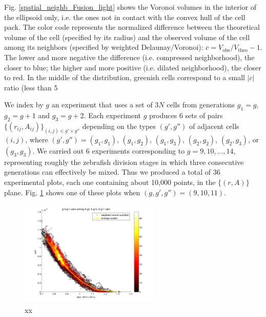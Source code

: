 Fig. \ref{spatial_neighb_Fusion_light} shows the Voronoi volumes in the interior of the ellipsoid only, i.e. the ones not in contact with the convex hull of the cell pack. The color code represents the normalized difference between the theoretical volume of the cell (specified by its radius) and the observed volume of the cell among its neighbors (specified by weighted Delaunay/Voronoi): $c = V_{\mathrm{obs}}/V_{\mathrm{theo}} - 1$. The lower and more negative the difference (i.e. compressed neighborhood), the closer to blue; the higher and more positive (i.e. dilated neighborhood), the closer to red. In the middle of the distribution, greenish cells correspond to a small $|c|$ ratio (less than 5%

We index by $g$ an experiment that uses a set of $3N$ cells from generations $g_1=g$, $g_2=g+1$ and $g_3=g+2$. Each experiment $g$ produces 6 sets of pairs $\{(r_{ij}, A_{ij})\}_{(i,j)\in g'\times g''}$ depending on the types $(g',g'')$ of adjacent cells $(i,j)$, where $(g',g'') = (g_1,g_1)$, $(g_1,g_2)$, $(g_1,g_3)$, $(g_2,g_2)$, $(g_2,g_3)$, or $(g_3,g_3)$. We carried out 6 experiments corresponding to $g = 9,10,...,14$, representing roughly the zebrafish division stages in which three consecutive generations can effectively be mixed. Thus we produced a total of 36 experimental plots, each one containing about 10,000 points, in the $\{(r, A)\}$ plane. Fig. \ref{spatial_neighb_g10_g11_exp9_simple} shows one of these plots when $(g,g',g'')=(9,10,11)$.
\begin{figure}
\begin{center}
\includegraphics[width=0.6\textwidth]{../../images/MECAGEN/spatial_neighb/g10_g11_exp9_simple.png}
\end{center}
\caption{xx}
\label{spatial_neighb_g10_g11_exp9_simple}
\end{figure}


